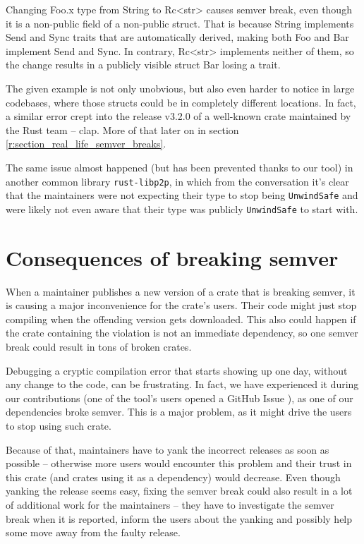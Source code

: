 \documentclass[licencjacka,en]{pracamgr}
\begin{document}
Changing {\ttfamily Foo.x} type from {\ttfamily String} to {\ttfamily Rc<str>}
causes semver break, even though it is a non-public field of a non-public struct.
That is because {\ttfamily String} implements {\ttfamily Send} and {\ttfamily Sync} traits
that are automatically derived, making both {\ttfamily Foo} and {\ttfamily Bar}
implement {\ttfamily Send} and {\ttfamily Sync}.
In contrary, {\ttfamily Rc<str>} implements neither of them,
so the change results in a publicly visible struct {\ttfamily Bar} losing a trait.

The given example is not only unobvious, but also even harder to notice
in large codebases, where those structs could be in completely different locations.
In fact, a similar error crept into the release v3.2.0 of a well-known crate
maintained by the Rust team -- {\ttfamily clap}.
More of that later on in section \ref{r:section_real_life_semver_breaks}.

The same issue almost happened
(but has been prevented thanks to our tool)
in another common library \texttt{rust-libp2p},
in which from the conversation \cite{issue-libp2p} it's clear that the maintainers
were not expecting their type to stop being \texttt{UnwindSafe} and were likely not even aware that
their type was publicly \texttt{UnwindSafe} to start with.

\section{Consequences of breaking semver}

When a maintainer publishes a new version of a crate that is breaking semver,
it is causing a major inconvenience for the crate's users.
Their code might just stop compiling when the offending version gets downloaded.
This also could happen if the crate containing the violation is not an immediate dependency,
so one semver break could result in tons of broken crates.

Debugging a cryptic compilation error that starts showing up one day,
without any change to the code, can be frustrating. In fact, we have experienced it during our contributions
(one of the tool's users opened a GitHub Issue \cite{issue-compiling-fails}), as one of our dependencies broke semver. This is a major problem, as it might drive the users to stop using such crate.

Because of that, maintainers have to yank
the incorrect releases as soon as possible
-- otherwise more users would encounter this problem and their trust
in this crate (and crates using it as a dependency)
would decrease. Even though yanking the release seems easy, fixing the semver break could also result in a lot of additional work for the maintainers -- they have to investigate the semver break when it is reported, inform the users about the yanking and possibly help some move away from the faulty release.
\end{document}
